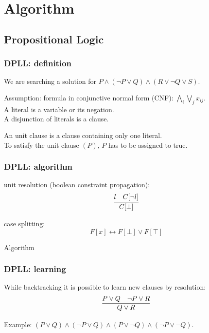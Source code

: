 \documentclass{beamer}
\begin{document}
\section{Algorithm}
\subsection{Propositional Logic}
\begin{frame}
  \frametitle{DPLL: definition}
  We are searching a solution for $P \land (\neg P \lor Q) \land (R \lor \neg Q \lor S)$.

  \vspace{10pt}

  Assumption: formula in conjunctive normal form (CNF): $\bigwedge_i \bigvee_j x_{ij}$.\\
  A \alert{literal} is a variable or its negation.\\
  A disjunction of literals is a \alert{clause}.

  \vspace{10pt}

  An \alert{unit} clause is a clause containing \alert{only one literal}.\\
  To satisfy the unit clause $(P)$, $P$ has to be assigned to true.

\end{frame}

\begin{frame}
  \frametitle{DPLL: algorithm}

  unit resolution (boolean constraint propagation): \[\infer{C[\bot]}{l & C[\neg l]}\]

  case splitting: \[ F[x] \leftrightarrow F[\bot] \lor F[\top] \]
  
  \begin{block}{Algorithm}
  \centering
  \end{block}
\end{frame}

\begin{frame}
  \frametitle{DPLL: learning}
  While backtracking it is possible to learn new clauses by resolution:
  \[\infer{Q \lor R}{P \lor Q & \neg P \lor R}\]

  \vspace{10pt}

  Example: $(P \lor Q) \land (\neg P \lor Q) \land (P \lor \neg Q) \land (\neg P \lor \neg Q)$.
\end{frame}
\end{document}
